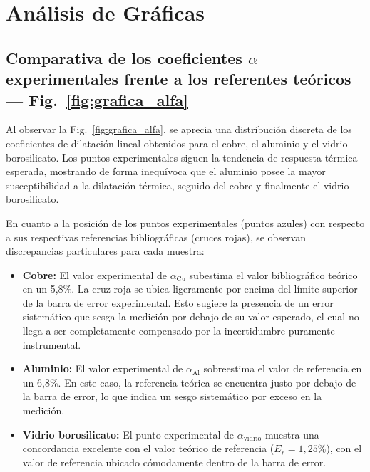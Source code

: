 
\section{Análisis de Gráficas}
\label{sec:analisis_graficas}

\subsection{Comparativa de los coeficientes \texorpdfstring{$\alpha$}{alpha} experimentales frente a los referentes teóricos --- Fig.~\ref{fig:grafica_alfa}}

Al observar la Fig.~\ref{fig:grafica_alfa}, se aprecia una distribución discreta de los coeficientes de dilatación lineal obtenidos para el cobre, el aluminio y el vidrio borosilicato. Los puntos experimentales siguen la tendencia de respuesta térmica esperada, mostrando de forma inequívoca que el aluminio posee la mayor susceptibilidad a la dilatación térmica, seguido del cobre y finalmente el vidrio borosilicato.

En cuanto a la posición de los puntos experimentales (puntos azules) con respecto a sus respectivas referencias bibliográficas (cruces rojas), se observan discrepancias particulares para cada muestra:
\begin{itemize}
    \item \textbf{Cobre:} El valor experimental de $\alpha_{\text{Cu}}$ subestima el valor bibliográfico teórico en un 5,8\%. La cruz roja se ubica ligeramente por encima del límite superior de la barra de error experimental. Esto sugiere la presencia de un error sistemático que sesga la medición por debajo de su valor esperado, el cual no llega a ser completamente compensado por la incertidumbre puramente instrumental.
    \item \textbf{Aluminio:} El valor experimental de $\alpha_{\text{Al}}$ sobreestima el valor de referencia en un 6,8\%. En este caso, la referencia teórica se encuentra justo por debajo de la barra de error, lo que indica un sesgo sistemático por exceso en la medición.
    \item \textbf{Vidrio borosilicato:} El punto experimental de $\alpha_{\text{vidrio}}$ muestra una concordancia excelente con el valor teórico de referencia ($E_r = 1{,}25\%$), con el valor de referencia ubicado cómodamente dentro de la barra de error.
\end{itemize}

